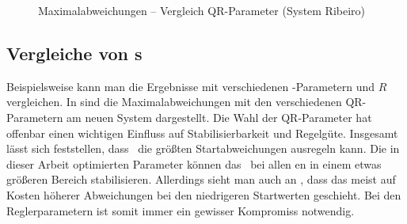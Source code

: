 \begin{figure}[htbp]
	\caption{Maximalabweichungen -- Vergleich QR-Parameter (System Ribeiro)}
	\label{fig:qrvglrib}
\end{figure}

\subsection{Vergleiche von \xots s}\label{subsec:xotsvgl}

Beispielsweise kann man die Ergebnisse mit verschiedenen \ricc-Parametern  und $R$ vergleichen.
In  sind die Maximalabweichungen mit den verschiedenen QR-Parametern  am neuen System dargestellt.
Die Wahl der QR-Parameter hat offenbar einen wichtigen Einfluss auf Stabilisierbarkeit und Regelgüte.
Insgesamt lässt sich feststellen, dass \apd\ die größten Startabweichungen ausregeln kann.
Die in dieser Arbeit optimierten Parameter können das \dpd\ bei allen \ap en in einem etwas größeren Bereich stabilisieren.
Allerdings sieht man auch \zB an \apve, dass das meist auf Kosten höherer Abweichungen bei den niedrigeren Startwerten geschieht.
Bei den Reglerparametern ist somit immer ein gewisser Kompromiss notwendig.


